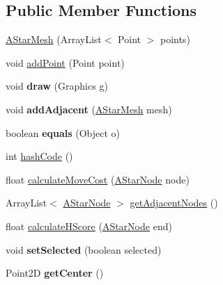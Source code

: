 \subsection*{Public Member Functions}
\begin{DoxyCompactItemize}
\item 
\hyperlink{classa__star_1_1example_1_1_a_star_mesh_abc6eb8b50c6ab8e853c475d98165e431}{A\-Star\-Mesh} (Array\-List$<$ Point $>$ points)
\item 
void \hyperlink{classa__star_1_1example_1_1_a_star_mesh_ae1fffa184acad06f5764528e39b7315f}{add\-Point} (Point point)
\item 
\hypertarget{classa__star_1_1example_1_1_a_star_mesh_aae4c67360a8ea90a95c9895386c4ed48}{void {\bfseries draw} (Graphics g)}\label{classa__star_1_1example_1_1_a_star_mesh_aae4c67360a8ea90a95c9895386c4ed48}

\item 
\hypertarget{classa__star_1_1example_1_1_a_star_mesh_af87cd72d40a73cadd7bd479e01b79e0e}{void {\bfseries add\-Adjacent} (\hyperlink{classa__star_1_1example_1_1_a_star_mesh}{A\-Star\-Mesh} mesh)}\label{classa__star_1_1example_1_1_a_star_mesh_af87cd72d40a73cadd7bd479e01b79e0e}

\item 
\hypertarget{classa__star_1_1example_1_1_a_star_mesh_a7c329165ace0596ec8780163af782e4e}{boolean {\bfseries equals} (Object o)}\label{classa__star_1_1example_1_1_a_star_mesh_a7c329165ace0596ec8780163af782e4e}

\item 
int \hyperlink{classa__star_1_1example_1_1_a_star_mesh_a3b79dcad4042e9e52bb4def6bf3cd153}{hash\-Code} ()
\item 
float \hyperlink{classa__star_1_1example_1_1_a_star_mesh_a61a6ccb2e73efe277bfa005ae4dc88a9}{calculate\-Move\-Cost} (\hyperlink{classa__star_1_1_a_star_node}{A\-Star\-Node} node)
\item 
Array\-List$<$ \hyperlink{classa__star_1_1_a_star_node}{A\-Star\-Node} $>$ \hyperlink{classa__star_1_1example_1_1_a_star_mesh_a3a5180a2ce88218a07c40d022ab40dc9}{get\-Adjacent\-Nodes} ()
\item 
float \hyperlink{classa__star_1_1example_1_1_a_star_mesh_a75d9ee659d5ce2c72b27c190b5352050}{calculate\-H\-Score} (\hyperlink{classa__star_1_1_a_star_node}{A\-Star\-Node} end)
\item 
\hypertarget{classa__star_1_1example_1_1_a_star_mesh_a7e28f352d55099059192f07d2d34dc54}{void {\bfseries set\-Selected} (boolean selected)}\label{classa__star_1_1example_1_1_a_star_mesh_a7e28f352d55099059192f07d2d34dc54}

\item 
\hypertarget{classa__star_1_1example_1_1_a_star_mesh_a9af6e5662db762cb8c2bdc36d3d824ec}{Point2\-D {\bfseries get\-Center} ()}\label{classa__star_1_1example_1_1_a_star_mesh_a9af6e5662db762cb8c2bdc36d3d824ec}

\end{DoxyCompactItemize}


